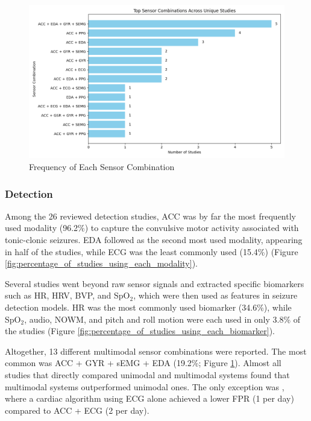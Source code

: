 \begin{figure}
    \centering
    \includegraphics[width=1\textwidth]{Results/figures/freq_of_each_sensor_comp.png}
    \caption{Frequency of Each Sensor Combination}
    \label{fig:freq_of_each_sensor_comp}
\end{figure}

\subsubsection{Detection}
Among the 26 reviewed detection studies, ACC was by far the most frequently used modality (96.2\%) to capture the convulsive motor activity associated with tonic-clonic seizures. EDA followed as the second most used modality, appearing in half of the studies, while ECG was the least commonly used (15.4\%) (Figure \ref{fig:percentage_of_studies_using_each_modality}).

Several studies went beyond raw sensor signals and extracted specific biomarkers such as HR, HRV, BVP, and SpO$_2$, which were then used as features in seizure detection models. HR was the most commonly used biomarker (34.6\%), while SpO$_2$, audio, NOWM, and pitch and roll motion were each used in only 3.8\% of the studies (Figure \ref{fig:percentage_of_studies_using_each_biomarker}).

Altogether, 13 different multimodal sensor combinations were reported. The most common was ACC + GYR + sEMG + EDA (19.2\%; Figure \ref{fig:freq_of_each_sensor_comp}). Almost all studies that directly compared unimodal and multimodal systems \cite{Yu2023-ss,Milosevic2016-ee,De_Cooman2018-pq,Chowdhury2022-bi,Ge2023-ab, Wang2025-my,Tang2021-td,Li2022-ty,Hegarty-Craver2021-hk,Poh2012-af,Hamlin2021-sd,Wu2024-yl} found that multimodal systems outperformed unimodal ones. The only exception was \cite{Hegarty-Craver2021-hk}, where a cardiac algorithm using ECG alone achieved a lower FPR (1 per day) compared to ACC + ECG (2 per day).

